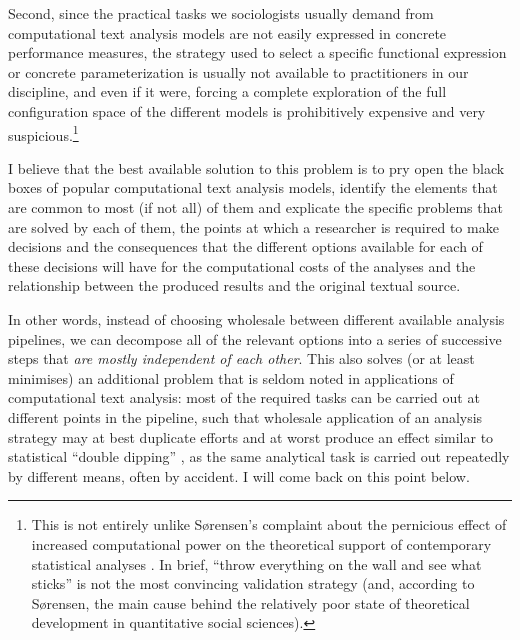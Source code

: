 Second, since the practical tasks we sociologists usually demand from computational text analysis models are not easily expressed in concrete performance measures, the strategy used to select a specific functional expression or concrete parameterization is usually not available to practitioners in our discipline, and even if it were, forcing a complete exploration of the full configuration space of the different models is prohibitively expensive and very suspicious.\footnote{
    \label{foot:sorensen}
    This is not entirely unlike Sørensen's complaint about the pernicious effect of increased computational power on the theoretical support of contemporary statistical analyses \citep{sorensen1998}.
    In brief, ``throw everything on the wall and see what sticks'' is not the most convincing validation strategy (and, according to Sørensen, the main cause behind the relatively poor state of theoretical development in quantitative social sciences).
}

I believe that the best available solution to this problem is to pry open the black boxes of popular computational text analysis models, identify the elements that are common to most (if not all) of them and explicate the specific problems that are solved by each of them, the points at which a researcher is required to make decisions and the consequences that the different options available for each of these decisions will have for the computational costs of the analyses and the relationship between the produced results and the original textual source.

In other words, instead of choosing wholesale between different available analysis pipelines, we can decompose all of the relevant options into a series of successive steps that \emph{are mostly independent of each other}.
This also solves (or at least minimises) an additional problem that is seldom noted in applications of computational text analysis: most of the required tasks can be carried out at different points in the pipeline, such that wholesale application of an analysis strategy may at best duplicate efforts and at worst produce an effect similar to statistical ``double dipping'' \citep{kriegeskorte2009}, as the same analytical task is carried out repeatedly by different means, often by accident.
I will come back on this point below.

